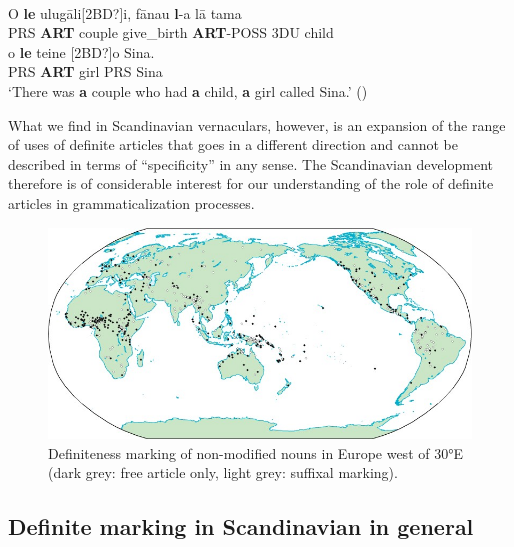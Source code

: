 \ea\label{}
\\
\gll	[2BD?]O  \textbf{le} ulug\=ali[2BD?]i,  f\=anau  \textbf{l}{}-a  l\=a  tama\\
		PRS  \textbf{ART} couple  give\_birth  \textbf{ART}{}-POSS  3DU  child\\
\gll	[2BD?]o  \textbf{le} teine  [2BD?]o  Sina.\\
		PRS  \textbf{ART} girl  PRS  Sina\\
\glt ‘There was \textbf{a} couple who had \textbf{a} child, \textbf{a} girl called Sina.’ (\citet[259]{HovdhaugenEtAl1992})

\z

What we find in Scandinavian vernaculars, however, is an expansion of the range of uses of definite articles that goes in a different direction and cannot be described in terms of “specificity” in any sense. The Scandinavian development therefore is of considerable interest for our understanding of the role of definite articles in grammaticalization processes.

\begin{figure}[h]

\includegraphics{figures_mod/image10}
\caption{Definiteness marking of non-modified nouns in Europe west of 30°E (dark grey: free article only, light grey: suffixal marking).}
\label{map:10}

\end{figure}

\subsection{ Definite marking in Scandinavian in general}
\label{bkm:Ref224380083}

